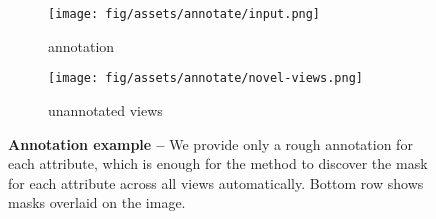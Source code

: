\begin{figure*}
    \centering
    \begin{subfigure}[b]{0.164\linewidth}
        \centering
        \texttt{[image: fig/assets/annotate/input.png]}
        \caption{annotation}
    \end{subfigure}
    \hfill{}
    \begin{subfigure}[b]{0.816\linewidth}
        \centering
        \texttt{[image: fig/assets/annotate/novel-views.png]}
        \caption{unannotated views}
    \end{subfigure}
    \caption{{\bf Annotation example -- }
    We provide only a rough annotation for each attribute, which is enough for the method to discover the mask for each attribute across all views automatically.
    Bottom row shows masks overlaid on the image.
    }
    \label{fig:annotate}
\end{figure*}